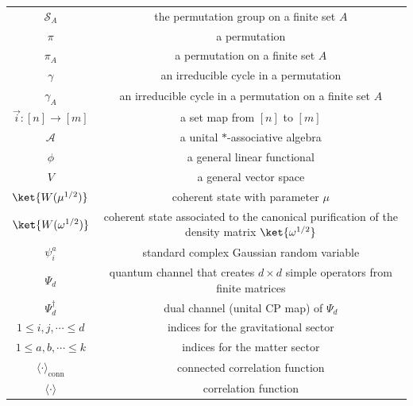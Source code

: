 \documentclass[a4paper,11pt]{article}
\theoremstyle{definition}
\numberwithin{equation}{section}
\begin{document}
\begin{longtable}[H]{c|c}
        \\
        $\mathcal{S}_A$ & the permutation group on a finite set $A$
        \\
        $\pi$ & a permutation 
        \\
        $\pi_A$ & a permutation on a finite set $A$
        \\
        $\gamma$ & an irreducible cycle in a permutation
        \\
        $\gamma_A$ & an irreducible cycle in a permutation on a finite set $A$
        \\
        $\vec{i}:[n]\rightarrow[m]$ & a set map from $[n]$ to $[m]$
        \\
        $\mathcal{A}$ & a unital $*$-associative algebra
        \\
        $\phi$ & a general linear functional
        \\
        $V$ & a general vector space
        \\
        $\ket{W(\mu^{1/2})}$ & coherent state with parameter $\mu$
        \\
        $\ket{W(\omega^{1/2})}$ &  coherent state associated to the canonical purification of the density matrix $\ket{\omega^{1/2}}$
        \\
        $\psi_i^a$ & standard complex Gaussian random variable
        \\
        $\Psi_d$ & quantum channel that creates $d\times d$ simple operators from finite matrices
        \\
        $\Psi_d^\dagger$ & dual channel (unital CP map) of $\Psi_d$
        \\
        $1\leq i,j,\cdots\leq d$ & indices for the gravitational sector
        \\
        $1\leq a,b,\cdots\leq k$ & indices for the matter sector
        \\
        $\langle\cdot\rangle_\text{conn}$ & connected correlation function
        \\
        $\langle\cdot\rangle$ & correlation function
        
\end{longtable}


\end{document}
